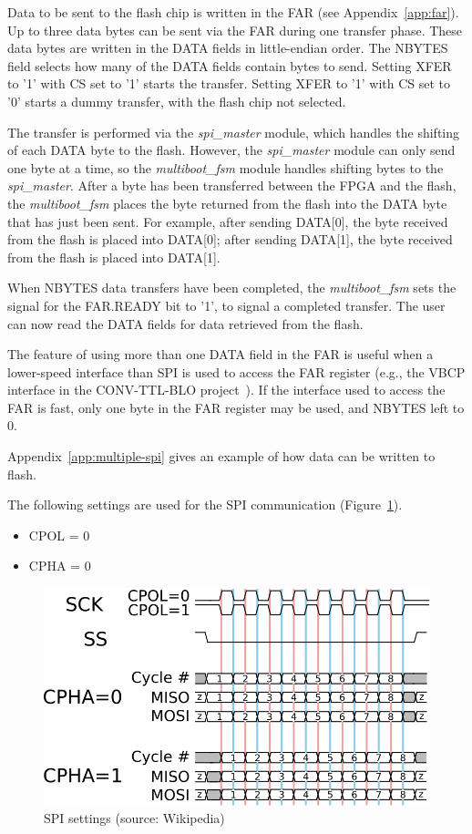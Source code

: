 \documentclass[a4paper,11pt]{article}
\begin{document}
Data to be sent to the flash chip is written in the FAR (see Appendix~\ref{app:far}).
Up to three data bytes can be sent via the FAR during one transfer phase. These data
bytes are written in the DATA fields in little-endian order. The NBYTES field selects
how many of the DATA fields contain bytes to send. Setting XFER to '1' with CS set to
'1' starts the transfer. Setting XFER to '1' with CS set to '0' starts a dummy
transfer, with the flash chip not selected.

The transfer is performed via the \textit{spi\_master} module, which handles the
shifting of each DATA byte to the flash. However, the \textit{spi\_master} module
can only send one byte at a time, so the \textit{multiboot\_fsm} module handles
shifting bytes to the \textit{spi\_master}. After a byte has been transferred
between the FPGA and the flash, the \textit{multiboot\_fsm} places the byte
returned from the flash into the DATA byte that has just been sent. For example,
after sending DATA[0], the byte received from the flash is placed into DATA[0];
after sending DATA[1], the byte received from the flash is placed into DATA[1].

When NBYTES data transfers have been completed, the \textit{multiboot\_fsm} sets
the signal for the FAR.READY bit to '1', to signal a completed transfer. The user
can now read the DATA fields for data retrieved from the flash.

The feature of using more than one DATA field in the FAR is useful when a lower-speed
interface than SPI is used to access the FAR register (e.g., the VBCP interface in
the CONV-TTL-BLO project~\cite{ctb-proj}). If the interface used to access the FAR
is fast, only one byte in the FAR register may be used, and NBYTES left to 0.

Appendix~\ref{app:multiple-spi} gives an example of how data can be written to flash.

The following settings are used for the SPI communication (Figure~\ref{fig:spi-mode}).
\begin{itemize}
  \item CPOL = 0
  \item CPHA = 0
\end{itemize}

\begin{figure}[h]
  \centerline{\includegraphics[width=.7\textwidth]{fig/spi-mode}}
  \caption{SPI settings (source: Wikipedia)}
  \label{fig:spi-mode}
\end{figure}
\end{document}
